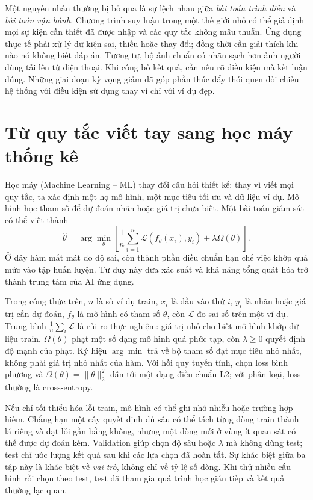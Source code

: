 \documentclass[12pt,a4paper]{report}
\begin{document}
Một nguyên nhân thường bị bỏ qua là sự lệch nhau giữa \emph{bài toán trình diễn} và \emph{bài toán vận hành}. Chương trình suy luận trong một thế giới nhỏ có thể giả định mọi sự kiện cần thiết đã được nhập và các quy tắc không mâu thuẫn. Ứng dụng thực tế phải xử lý dữ kiện sai, thiếu hoặc thay đổi; đồng thời cần giải thích khi nào nó không biết đáp án. Tương tự, bộ ảnh chuẩn có nhãn sạch hơn ảnh người dùng tải lên từ điện thoại. Khi công bố kết quả, cần nêu rõ điều kiện mà kết luận đúng. Những giai đoạn kỳ vọng giảm đã góp phần thúc đẩy thói quen đối chiếu hệ thống với điều kiện sử dụng thay vì chỉ với ví dụ đẹp.

\section{Từ quy tắc viết tay sang học máy thống kê}
Học máy (Machine Learning -- ML) thay đổi câu hỏi thiết kế: thay vì viết mọi quy tắc, ta xác định một họ mô hình, một mục tiêu tối ưu và dữ liệu ví dụ. Mô hình học tham số để dự đoán nhãn hoặc giá trị chưa biết. Một bài toán giám sát có thể viết thành
\begin{equation}\hat{\theta}=\arg\min_{\theta}\left[\frac1n\sum_{i=1}^{n}\mathcal L(f_\theta(x_i),y_i)+\lambda\Omega(\theta)\right].\end{equation}
Ở đây hàm mất mát đo độ sai, còn thành phần điều chuẩn hạn chế việc khớp quá mức vào tập huấn luyện. Tư duy này đưa xác suất và khả năng tổng quát hóa trở thành trung tâm của AI ứng dụng.

Trong công thức trên, $n$ là số ví dụ train, $x_i$ là đầu vào thứ $i$, $y_i$ là nhãn hoặc giá trị cần dự đoán, $f_\theta$ là mô hình có tham số $\theta$, còn $\mathcal L$ đo sai số trên một ví dụ. Trung bình $\frac1n\sum_i\mathcal L$ là rủi ro thực nghiệm: giá trị nhỏ cho biết mô hình khớp dữ liệu train. $\Omega(\theta)$ phạt một số dạng mô hình quá phức tạp, còn $\lambda\geq0$ quyết định độ mạnh của phạt. Ký hiệu $\arg\min$ trả về bộ tham số đạt mục tiêu nhỏ nhất, không phải giá trị nhỏ nhất của hàm. Với hồi quy tuyến tính, chọn loss bình phương và $\Omega(\theta)=\lVert\theta\rVert_2^2$ dẫn tới một dạng điều chuẩn L2; với phân loại, loss thường là cross-entropy.

Nếu chỉ tối thiểu hóa lỗi train, mô hình có thể ghi nhớ nhiễu hoặc trường hợp hiếm. Chẳng hạn một cây quyết định đủ sâu có thể tách từng dòng train thành lá riêng và đạt lỗi gần bằng không, nhưng một dòng mới ở vùng ít quan sát có thể được dự đoán kém. Validation giúp chọn độ sâu hoặc $\lambda$ mà không dùng test; test chỉ ước lượng kết quả sau khi các lựa chọn đã hoàn tất. Sự khác biệt giữa ba tập này là khác biệt về \emph{vai trò}, không chỉ về tỷ lệ số dòng. Khi thử nhiều cấu hình rồi chọn theo test, test đã tham gia quá trình học gián tiếp và kết quả thường lạc quan.
\end{document}
